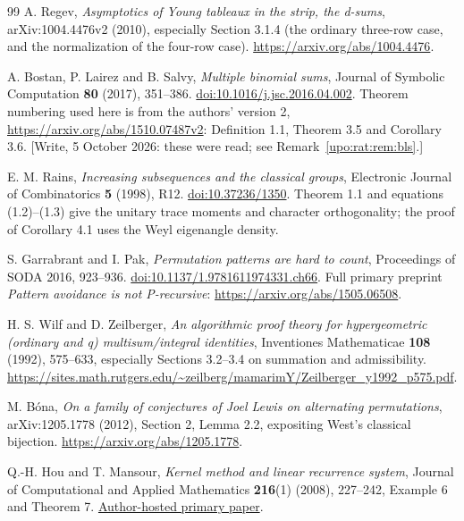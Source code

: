 \documentclass[11pt,letterpaper]{article}
\theoremstyle{remark}\newtheorem{remark}[theorem]{Remark}
\numberwithin{equation}{section}
\begin{document}
\begin{thebibliography}{99}
A. Regev, \emph{Asymptotics of Young tableaux in the strip, the d-sums}, arXiv:1004.4476v2 (2010), especially Section 3.1.4 (the ordinary three-row case, and the normalization of the four-row case). \url{https://arxiv.org/abs/1004.4476}.

A. Bostan, P. Lairez and B. Salvy, \emph{Multiple binomial sums}, Journal of Symbolic Computation \textbf{80} (2017), 351--386. \href{https://doi.org/10.1016/j.jsc.2016.04.002}{doi:10.1016/j.jsc.2016.04.002}. Theorem numbering used here is from the authors' version 2, \url{https://arxiv.org/abs/1510.07487v2}: Definition 1.1, Theorem 3.5 and Corollary 3.6. [Write, 5 October 2026: these were read; see Remark~\ref{upo:rat:rem:bls}.]

E. M. Rains, \emph{Increasing subsequences and the classical groups}, Electronic Journal of Combinatorics \textbf{5} (1998), R12. \href{https://doi.org/10.37236/1350}{doi:10.37236/1350}. Theorem 1.1 and equations (1.2)--(1.3) give the unitary trace moments and character orthogonality; the proof of Corollary 4.1 uses the Weyl eigenangle density.

S. Garrabrant and I. Pak, \emph{Permutation patterns are hard to count}, Proceedings of SODA 2016, 923--936. \href{https://doi.org/10.1137/1.9781611974331.ch66}{doi:10.1137/1.9781611974331.ch66}. Full primary preprint \emph{Pattern avoidance is not P-recursive}: \url{https://arxiv.org/abs/1505.06508}.

H. S. Wilf and D. Zeilberger, \emph{An algorithmic proof theory for hypergeometric (ordinary and q) multisum/integral identities}, Inventiones Mathematicae \textbf{108} (1992), 575--633, especially Sections 3.2--3.4 on summation and admissibility. \url{https://sites.math.rutgers.edu/~zeilberg/mamarimY/Zeilberger_y1992_p575.pdf}.

M. B\'ona, \emph{On a family of conjectures of Joel Lewis on alternating permutations}, arXiv:1205.1778 (2012), Section 2, Lemma 2.2, expositing West's classical bijection. \url{https://arxiv.org/abs/1205.1778}.

Q.-H. Hou and T. Mansour, \emph{Kernel method and linear recurrence system}, Journal of Computational and Applied Mathematics \textbf{216}(1) (2008), 227--242, Example 6 and Theorem 7. \href{https://cfc.nankai.edu.cn/_upload/article/files/6c/0a/8a70749e40e2a1f0c7295f53f2f3/614e3544-a028-4ba8-8705-839f4f667ed0.pdf}{Author-hosted primary paper}.


\end{thebibliography}
\end{document}

